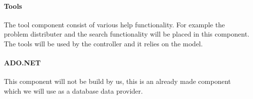 \paragraph{Tools}
The tool component consist of various help functionality. For example the problem distributer and the search functionality will be placed in this component. The tools will be used by the controller and it relies on the model. 

\paragraph{ADO.NET}
This component will not be build by us, this is an already made component which we will use as a database data provider. 

